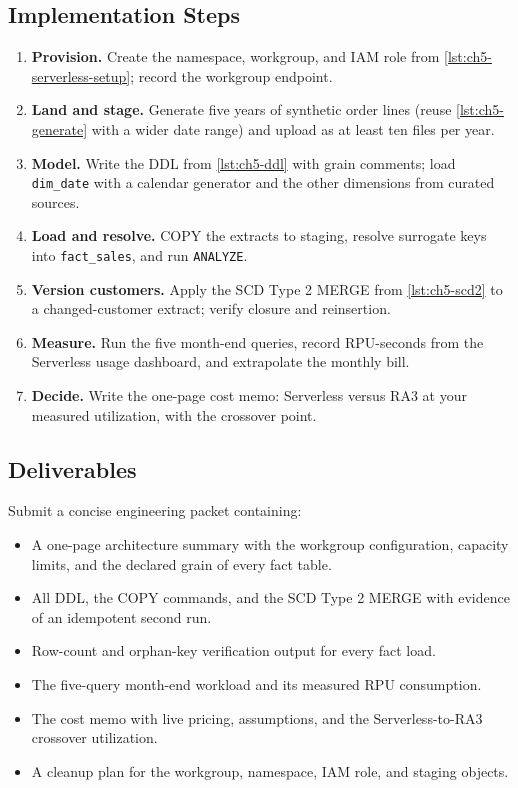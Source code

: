 \subsection*{Implementation Steps}
\begin{enumerate}
    \item \textbf{Provision.} Create the namespace, workgroup, and IAM role from \cref{lst:ch5-serverless-setup}; record the workgroup endpoint.
    \item \textbf{Land and stage.} Generate five years of synthetic order lines (reuse \cref{lst:ch5-generate} with a wider date range) and upload as at least ten files per year.
    \item \textbf{Model.} Write the DDL from \cref{lst:ch5-ddl} with grain comments; load \texttt{dim\_date} with a calendar generator and the other dimensions from curated sources.
    \item \textbf{Load and resolve.} COPY the extracts to staging, resolve surrogate keys into \texttt{fact\_sales}, and run \texttt{ANALYZE}.
    \item \textbf{Version customers.} Apply the SCD Type 2 MERGE from \cref{lst:ch5-scd2} to a changed-customer extract; verify closure and reinsertion.
    \item \textbf{Measure.} Run the five month-end queries, record RPU-seconds from the Serverless usage dashboard, and extrapolate the monthly bill.
    \item \textbf{Decide.} Write the one-page cost memo: Serverless versus RA3 at your measured utilization, with the crossover point.
\end{enumerate}

\subsection*{Deliverables}
Submit a concise engineering packet containing:
\begin{itemize}
    \item A one-page architecture summary with the workgroup configuration, capacity limits, and the declared grain of every fact table.
    \item All DDL, the COPY commands, and the SCD Type 2 MERGE with evidence of an idempotent second run.
    \item Row-count and orphan-key verification output for every fact load.
    \item The five-query month-end workload and its measured RPU consumption.
    \item The cost memo with live pricing, assumptions, and the Serverless-to-RA3 crossover utilization.
    \item A cleanup plan for the workgroup, namespace, IAM role, and staging objects.
\end{itemize}

